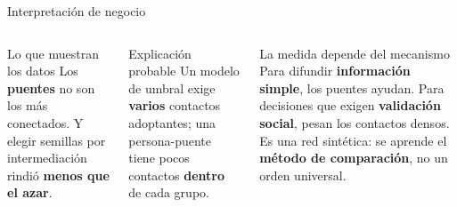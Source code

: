 \documentclass[aspectratio=169,xcolor=dvipsnames]{beamer}
\begin{document}
\begin{frame}{Interpretación de negocio}
\begin{columns}[c]
  \begin{block}{Lo que muestran los datos}
    \small Los \textbf{puentes} no son los más conectados. Y elegir semillas por intermediación rindió \textbf{menos que el azar}.
  \end{block}
  \begin{alertblock}{Explicación probable}
    \small Un modelo de umbral exige \textbf{varios} contactos adoptantes; una persona-puente tiene pocos contactos \textbf{dentro} de cada grupo.
  \end{alertblock}
  \begin{exampleblock}{La medida depende del mecanismo}
    \small Para difundir \textbf{información simple}, los puentes ayudan. Para decisiones que exigen \textbf{validación social}, pesan los contactos densos. Es una red sintética: se aprende el \textbf{método de comparación}, no un orden universal.
  \end{exampleblock}
\end{columns}
\end{frame}
\end{document}
